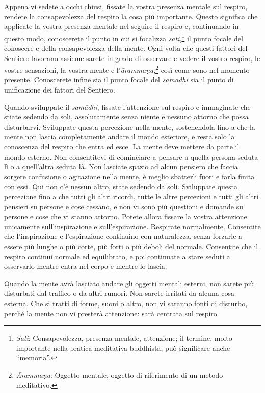 Appena vi sedete a occhi chiusi, fissate la vostra presenza mentale sul
respiro, rendete la consapevolezza del respiro la cosa più importante.
Questo significa che applicate la vostra presenza mentale nel seguire il
respiro e, continuando in questo modo, conoscerete il punto in cui si
focalizza \emph{sati},\footnote{\emph{Sati}: Consapevolezza, presenza
  mentale, attenzione; il termine, molto importante nella pratica
  meditativa buddhista, può significare anche ``memoria''.} il punto
focale del conoscere e della consapevolezza della mente. Ogni volta che
questi fattori del Sentiero lavorano assieme sarete in grado di
osservare e vedere il vostro respiro, le vostre sensazioni, la vostra
mente e l'\emph{ārammaṇa},\footnote{\emph{Ārammaṇa}: Oggetto mentale,
  oggetto di riferimento di un metodo meditativo.} così come sono nel
momento presente. Conoscerete infine sia il punto focale del
\emph{samādhi} sia il punto di unificazione dei fattori del Sentiero.

Quando sviluppate il \emph{samādhi}, fissate l'attenzione sul respiro e
immaginate che stiate sedendo da soli, assolutamente senza niente e
nessuno attorno che possa disturbarvi. Sviluppate questa percezione
nella mente, sostenendola fino a che la mente non lascia completamente
andare il mondo esteriore, e resta solo la conoscenza del respiro che
entra ed esce. La mente deve mettere da parte il mondo esterno. Non
consentitevi di cominciare a pensare a quella persona seduta lì o a
quell'altra seduta là. Non lasciate spazio ad alcun pensiero che faccia
sorgere confusione o agitazione nella mente, è meglio sbatterli fuori e
farla finita con essi. Qui non c'è nessun altro, state sedendo da soli.
Sviluppate questa percezione fino a che tutti gli altri ricordi, tutte
le altre percezioni e tutti gli altri pensieri su persone e cose
cessano, e non vi sono più questioni e domande su persone e cose che vi
stanno attorno. Potete allora fissare la vostra attenzione unicamente
sull'inspirazione e sull'espirazione. Respirate normalmente. Consentite
che l'inspirazione e l'espirazione continuino con naturalezza, senza
forzarle a essere più lunghe o più corte, più forti o più deboli del
normale. Consentite che il respiro continui normale ed equilibrato, e
poi continuate a stare seduti a osservarlo mentre entra nel corpo e
mentre lo lascia.

Quando la mente avrà lasciato andare gli oggetti mentali esterni, non
sarete più disturbati dal traffico o da altri rumori. Non sarete
irritati da alcuna cosa esterna. Che si tratti di forme, suoni o altro,
non vi saranno fonti di disturbo, perché la mente non vi presterà
attenzione: sarà centrata sul respiro.

